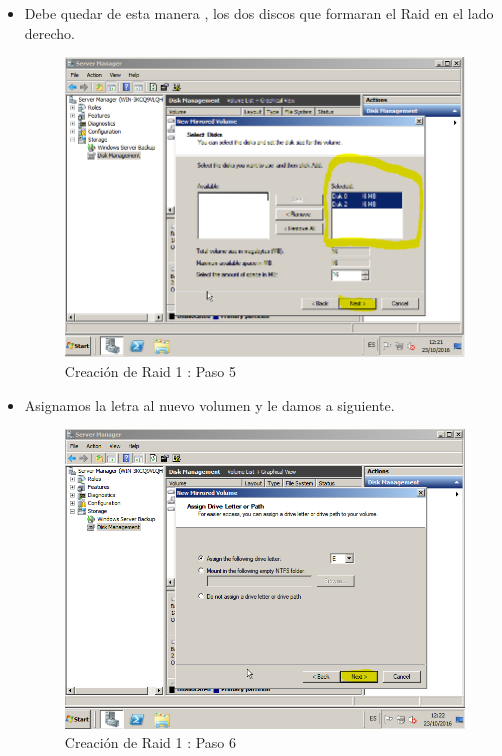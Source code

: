 \begin{itemize}
		\item Debe quedar de esta manera , los dos discos que formaran el Raid en el lado derecho.
		\begin{figure}[H] %
			\centering
			\includegraphics[scale=0.5]{pics/Captura5.png}  %
			\caption{Creación de Raid 1 : Paso 5} \label{fig:figura5}
		\end{figure}
	
		\item Asignamos la letra al nuevo volumen y le damos a siguiente.
		\begin{figure}[H] %
			\centering
			\includegraphics[scale=0.5]{pics/Captura6.png}  %
			\caption{Creación de Raid 1 : Paso 6} \label{fig:figura6}
		\end{figure}
	

\end{itemize}
